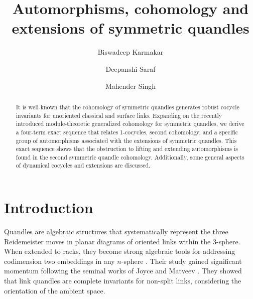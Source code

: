 \documentclass[11pt,reqno]{amsart}
\theoremstyle{definition}
\numberwithin{equation}{subsection}
\begin{document}
	\setcounter{section}{0}
	\title{Automorphisms, cohomology and extensions of symmetric quandles}
	\author{Biswadeep Karmakar}	
	\author{Deepanshi Saraf}
	\author{Mahender Singh}
	
	\address{Department of Mathematical Sciences, Indian Institute of Science Education and Research (IISER) Mohali, Sector 81,  S. A. S. Nagar, P. O. Manauli, Punjab 140306, India.}
	
	
	
\begin{abstract}
It is well-known that the cohomology of symmetric quandles generates robust cocycle invariants for unoriented classical and surface links. Expanding on the recently introduced module-theoretic generalized cohomology for symmetric quandles, we derive a four-term exact sequence that relates 1-cocycles, second cohomology, and a specific group of automorphisms associated with the extensions of symmetric quandles. This exact sequence shows that the obstruction to lifting and extending automorphisms is found in the second symmetric quandle cohomology. Additionally, some general aspects of dynamical cocycles and extensions are discussed.
\end{abstract}
\maketitle
	
\section{Introduction}
Quandles are algebraic structures that systematically represent the three Reidemeister moves in planar diagrams of oriented links within the 3-sphere. When extended to racks, they become strong algebraic tools for addressing codimension two embeddings in any $n$-sphere \cite{MR2255194}. Their study gained significant momentum following the seminal works of Joyce \cite{Joyce1979} and Matveev \cite{MR0672410}. They showed that link quandles are complete invariants for non-split links, considering the orientation of the ambient space.
\par
\end{document}
